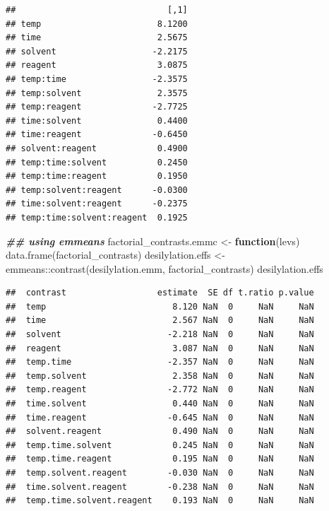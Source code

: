 \documentclass[
]{book}
\newenvironment{Shaded}{\begin{snugshade}}{\end{snugshade}}
\newcommand{\ControlFlowTok}[1]{\textcolor[rgb]{0.13,0.29,0.53}{\textbf{#1}}}
\newcommand{\DocumentationTok}[1]{\textcolor[rgb]{0.56,0.35,0.01}{\textbf{\textit{#1}}}}
\newcommand{\FunctionTok}[1]{\textcolor[rgb]{0.00,0.00,0.00}{#1}}
\newcommand{\NormalTok}[1]{#1}
\newcommand{\OtherTok}[1]{\textcolor[rgb]{0.56,0.35,0.01}{#1}}
\newcommand{\SpecialCharTok}[1]{\textcolor[rgb]{0.00,0.00,0.00}{#1}}
\newcommand{\StringTok}[1]{\textcolor[rgb]{0.31,0.60,0.02}{#1}}
\theoremstyle{definition}
\theoremstyle{definition}
\theoremstyle{definition}
\theoremstyle{definition}
\theoremstyle{remark}
\begin{document}
\begin{verbatim}
##                              [,1]
## temp                       8.1200
## time                       2.5675
## solvent                   -2.2175
## reagent                    3.0875
## temp:time                 -2.3575
## temp:solvent               2.3575
## temp:reagent              -2.7725
## time:solvent               0.4400
## time:reagent              -0.6450
## solvent:reagent            0.4900
## temp:time:solvent          0.2450
## temp:time:reagent          0.1950
## temp:solvent:reagent      -0.0300
## time:solvent:reagent      -0.2375
## temp:time:solvent:reagent  0.1925
\end{verbatim}

\begin{Shaded}
\begin{Highlighting}[]
\DocumentationTok{\#\# using emmeans}
\NormalTok{factorial\_contrasts.emmc }\OtherTok{\textless{}{-}} \ControlFlowTok{function}\NormalTok{(levs) }\FunctionTok{data.frame}\NormalTok{(factorial\_contrasts)}
\NormalTok{desilylation.effs }\OtherTok{\textless{}{-}}\NormalTok{ emmeans}\SpecialCharTok{::}\FunctionTok{contrast}\NormalTok{(desilylation.emm, }\StringTok{\textquotesingle{}factorial\_contrasts\textquotesingle{}}\NormalTok{)}
\NormalTok{desilylation.effs}
\end{Highlighting}
\end{Shaded}

\begin{verbatim}
##  contrast                  estimate  SE df t.ratio p.value
##  temp                         8.120 NaN  0     NaN     NaN
##  time                         2.567 NaN  0     NaN     NaN
##  solvent                     -2.218 NaN  0     NaN     NaN
##  reagent                      3.087 NaN  0     NaN     NaN
##  temp.time                   -2.357 NaN  0     NaN     NaN
##  temp.solvent                 2.358 NaN  0     NaN     NaN
##  temp.reagent                -2.772 NaN  0     NaN     NaN
##  time.solvent                 0.440 NaN  0     NaN     NaN
##  time.reagent                -0.645 NaN  0     NaN     NaN
##  solvent.reagent              0.490 NaN  0     NaN     NaN
##  temp.time.solvent            0.245 NaN  0     NaN     NaN
##  temp.time.reagent            0.195 NaN  0     NaN     NaN
##  temp.solvent.reagent        -0.030 NaN  0     NaN     NaN
##  time.solvent.reagent        -0.238 NaN  0     NaN     NaN
##  temp.time.solvent.reagent    0.193 NaN  0     NaN     NaN
\end{verbatim}
\end{document}
